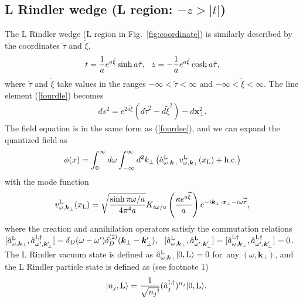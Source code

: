 \documentclass[aps,prd,preprintnumbers,nofootinbib,showpacs,11pt]{revtex4}%
\begin{document}
\begin{widetext}
\subsection{L Rindler wedge (L region: $-z>|t|$)}
The L Rindler wedge (L region in Fig.~\ref{fig:coordinate}) 
is similarly described by the coordinates $\tilde \tau$ and $\tilde\xi$, 
\begin{eqnarray}
t={1\over a}e^{a\tilde \xi}\sinh a\tilde \tau,~~
z=-{1\over a}e^{a\tilde \xi}\cosh a\tilde \tau,
\end{eqnarray}
where $\tilde \tau$ and $\tilde\xi$ take values in the ranges $-\infty<\tilde\tau<\infty$ and 
$-\infty<\tilde\xi<\infty$. The line element (\ref{fourdle}) becomes
\begin{eqnarray}
ds^2=e^{2a\tilde\xi}(d\tilde\tau^2-d\tilde\xi^2)-d\bm x_\perp^2.
\end{eqnarray}
The field equation is in the same form as (\ref{fourdee}), and 
we can expand the quantized field as
\begin{eqnarray}
\phi(x)=\int_{0}^{\infty} d \omega\int_{-\infty}^{\infty} d^2 k_\perp \left( {\hat a}_{\omega,{\bm k}_\perp}^{\rm L} v_{\omega,{\bm k}_\perp}^\L(x_\L)
+{\rm h.c.}
\right)
\label{qfL}
\end{eqnarray}
with the mode function
\begin{eqnarray}
v_{\omega,{\bm k}_\perp}^\L(x_\L)=\sqrt{\sinh \pi \omega/a\over 4\pi^4 a}
K_{i\omega/a}\left({\kappa e^{a\widetilde\xi}\over a}\right)e^{-i\bm k_\perp\cdot \bm x_\perp-i\omega\widetilde\tau},
\label{mfL}
\end{eqnarray}
where the creation and annihilation operators satisfy the commutation relations
$[{\hat a}^{\rm L}_{\omega,\bm k_\perp}, {\hat a}_{\omega',\bm k_\perp'}^{\rm L \dagger}]
=\delta_D(\omega-\omega') \delta_D^{(2)}(\bm k_\perp-\bm k_\perp'), 
~~
[{\hat a}^{\rm L}_{\omega,\bm k_\perp}, {\hat a}_{\omega',\bm k_\perp'}^{\rm L}]
=[{\hat a}^{\rm L \dagger}_{\omega,\bm k_\perp}, {\hat a}_{\omega',\bm k_\perp'}^{\rm L \dagger}]
=0
$. %
The L Rindler vacuum state is defined as 
$
\hat a_{\omega,\bm k_\perp}^{\rm L}|0,{\rm L}\rangle=0 
$
for~any $(\omega, \bm k_\perp)$, 
and the L Rindler particle state is defined as (see footnote 1) 
\begin{eqnarray}
&&|n_j,{\rm L}\rangle={1\over\sqrt{n_j!}}(\hat a_{j}^{\rm L \dagger})^{n_j}|0,{\rm L}\rangle.
\label{fourdLexcite}
\end{eqnarray}


\end{widetext}
\end{document}
